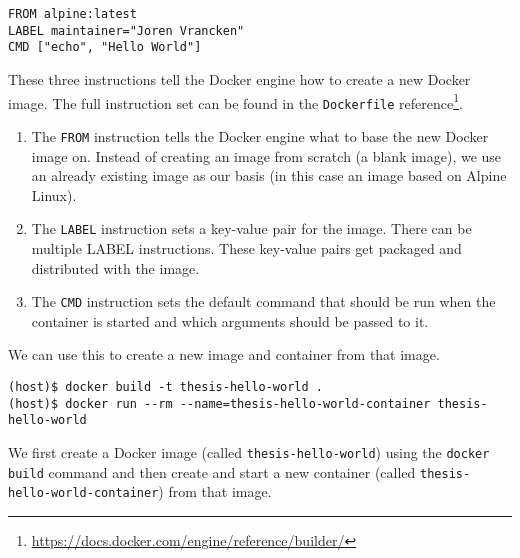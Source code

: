 \begin{lstlisting}[caption={A basic \lstinline{Dockerfile}.},label={listing:dockerfile-simple},captionpos=b]
FROM alpine:latest
LABEL maintainer="Joren Vrancken"
CMD ["echo", "Hello World"]
\end{lstlisting}

These three instructions tell the Docker engine how to create a new Docker image.
The full instruction set can be found in the \lstinline{Dockerfile} reference\footnote{\url{https://docs.docker.com/engine/reference/builder/}}.

\begin{enumerate}
    \item The \lstinline{FROM} instruction tells the Docker engine what to base the new Docker image on. Instead of creating an image from scratch (a blank image), we use an already existing image as our basis (in this case an image based on Alpine Linux).

    \item The \lstinline{LABEL} instruction sets a key-value pair for the image. There can be multiple LABEL instructions. These key-value pairs get packaged and distributed with the image.

    \item The \lstinline{CMD} instruction sets the default command that should be run when the container is started and which arguments should be passed to it.
\end{enumerate}

We can use this to create a new image and container from that image.
\begin{lstlisting}[caption={Creating a Docker container from a \lstinline{Dockerfile}.},label={listing:create-container},captionpos=b]
(host)$ docker build -t thesis-hello-world .
(host)$ docker run --rm --name=thesis-hello-world-container thesis-hello-world
\end{lstlisting}

We first create a Docker image (called \lstinline{thesis-hello-world}) using the \lstinline{docker build} command and then create and start a new container (called \lstinline{thesis-hello-world-container}) from that image.
